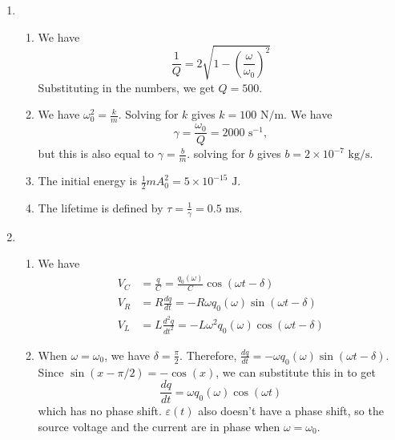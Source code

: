 \documentclass{article}
\begin{document}
\begin{enumerate}
    \item \begin{enumerate}
        \item We have 
        \begin{equation}
            \frac{1}{Q} = 2\sqrt{1-\left(\frac{\omega}{\omega_0}\right)^2}
        \end{equation}
        Substituting in the numbers, we get $Q=500$.
        \item We have $\omega_0^2 = \frac{k}{m}$. Solving for $k$ gives $k=100\text{ N/m}.$ We have 
        \begin{equation}
            \gamma = \frac{\omega_0}{Q} = 2000\text{ s}^{-1},
        \end{equation}
        but this is also equal to $\gamma = \frac{b}{m}$. solving for $b$ gives $b=2\times 10^{-7} \text{ kg/s}.$
        \item The initial energy is $\frac{1}{2}mA_0^2 = 5\times 10^{-15} \text{ J}.$
        \item The lifetime is defined by $\tau = \frac{1}{\gamma} = 0.5\text{ ms}.$
    \end{enumerate}
    \item \begin{enumerate}
        \item We have 
        \begin{align}
            V_C &= \frac{q}{C} = \frac{q_0(\omega)}{C}\cos(\omega t-\delta) \\ 
            V_R &= R\frac{dq}{dt} = -R\omega q_0(\omega)\sin(\omega t-\delta) \\ 
            V_L &= L\frac{d^2q}{dt^2} = -L\omega^2 q_0(\omega)\cos(\omega t-\delta)
        \end{align}
        \item When $\omega=\omega_0$, we have $\delta=\frac{\pi}{2}.$ Therefore, $\frac{dq}{dt} = -\omega q_0(\omega)\sin(\omega t- \delta).$ Since $\sin(x-\pi/2)=-\cos(x)$, we can substitute this in to get 
        \begin{equation}
            \frac{dq}{dt} = \omega q_0(\omega)\cos(\omega t)
        \end{equation}
        which has no phase shift. $\varepsilon(t)$ also doesn't have a phase shift, so the source voltage and the current are in phase when $\omega=\omega_0$.
    \end{enumerate}
\end{enumerate}
\end{document}
